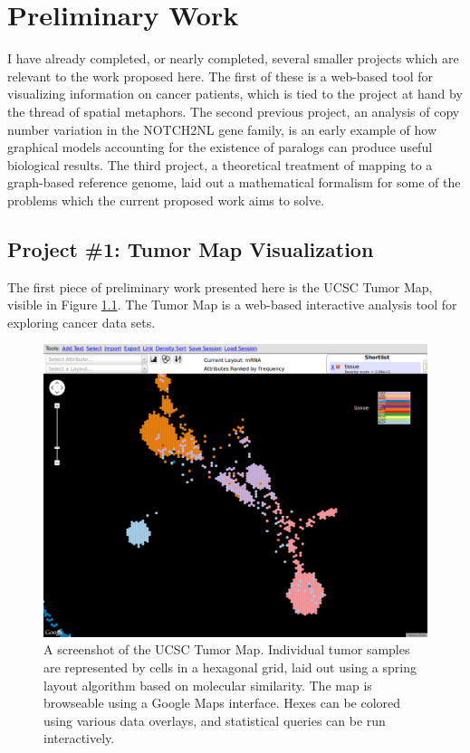 \documentclass[11pt,proposal]{ucthesis}
\begin{document}
\chapter{Preliminary Work}

I have already completed, or nearly completed, several smaller projects which are relevant to the work proposed here. The first of these is a web-based tool for visualizing information on cancer patients, which is tied to the project at hand by the thread of spatial metaphors. The second previous project, an analysis of copy number variation in the NOTCH2NL gene family, is an early example of how graphical models accounting for the existence of paralogs can produce useful biological results. The third project, a theoretical treatment of mapping to a graph-based reference genome, laid out a mathematical formalism for some of the problems which the current proposed work aims to solve.


\section{Project \#1: Tumor Map Visualization}

The first piece of preliminary work presented here is the UCSC Tumor Map, visible in Figure \ref{fig:tumormap}. The Tumor Map is a web-based interactive analysis tool for exploring cancer data sets. 

\begin{figure}[ht]
    \centering
    \includegraphics[width=1.0\textwidth]{figures/tumormap.png}
    \caption{A screenshot of the UCSC Tumor Map. Individual tumor samples are represented by cells in a hexagonal grid, laid out using a spring layout algorithm based on molecular similarity. The map is browseable using a Google Maps interface. Hexes can be colored using various data overlays, and statistical queries can be run interactively.}
    \label{fig:tumormap}
\end{figure}
\end{document}
